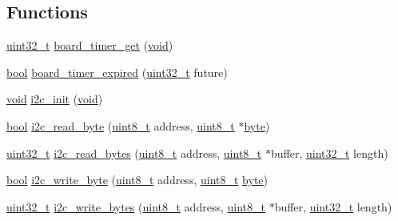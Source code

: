 \subsection*{Functions}
\begin{DoxyCompactItemize}
\item 
\hyperlink{_p_e___types_8h_a33594304e786b158f3fb30289278f5af}{uint32\+\_\+t} \hyperlink{_open_mote-_c_c2538_2i2c_8c_a1409dd4554f2fa814490c8d500eb4236}{board\+\_\+timer\+\_\+get} (\hyperlink{usb__devapi_8h_afabf60e7f57651d6d595a02c75f07cd0}{void})
\item 
\hyperlink{_p_e___types_8h_a97a80ca1602ebf2303258971a2c938e2}{bool} \hyperlink{_open_mote-_c_c2538_2i2c_8c_a7c18a2cb1673d859694a0b42bb7378b5}{board\+\_\+timer\+\_\+expired} (\hyperlink{_p_e___types_8h_a33594304e786b158f3fb30289278f5af}{uint32\+\_\+t} future)
\item 
\hyperlink{usb__devapi_8h_afabf60e7f57651d6d595a02c75f07cd0}{void} \hyperlink{group___i2_c_ga5730d9445429351b9f750084c5cb5aae}{i2c\+\_\+init} (\hyperlink{usb__devapi_8h_afabf60e7f57651d6d595a02c75f07cd0}{void})
\item 
\hyperlink{_p_e___types_8h_a97a80ca1602ebf2303258971a2c938e2}{bool} \hyperlink{group___i2_c_ga846c148c6c939378ab9db213af23b1ea}{i2c\+\_\+read\+\_\+byte} (\hyperlink{_p_e___types_8h_aba7bc1797add20fe3efdf37ced1182c5}{uint8\+\_\+t} address, \hyperlink{_p_e___types_8h_aba7bc1797add20fe3efdf37ced1182c5}{uint8\+\_\+t} $\ast$\hyperlink{_p_e___types_8h_a0c8186d9b9b7880309c27230bbb5e69d}{byte})
\item 
\hyperlink{_p_e___types_8h_a33594304e786b158f3fb30289278f5af}{uint32\+\_\+t} \hyperlink{group___i2_c_ga6c5d53542049a3b17a6c0f5c42b3f9f7}{i2c\+\_\+read\+\_\+bytes} (\hyperlink{_p_e___types_8h_aba7bc1797add20fe3efdf37ced1182c5}{uint8\+\_\+t} address, \hyperlink{_p_e___types_8h_aba7bc1797add20fe3efdf37ced1182c5}{uint8\+\_\+t} $\ast$buffer, \hyperlink{_p_e___types_8h_a33594304e786b158f3fb30289278f5af}{uint32\+\_\+t} length)
\item 
\hyperlink{_p_e___types_8h_a97a80ca1602ebf2303258971a2c938e2}{bool} \hyperlink{group___i2_c_ga6d9ff5e4b9a1909ada86224581be53b4}{i2c\+\_\+write\+\_\+byte} (\hyperlink{_p_e___types_8h_aba7bc1797add20fe3efdf37ced1182c5}{uint8\+\_\+t} address, \hyperlink{_p_e___types_8h_aba7bc1797add20fe3efdf37ced1182c5}{uint8\+\_\+t} \hyperlink{_p_e___types_8h_a0c8186d9b9b7880309c27230bbb5e69d}{byte})
\item 
\hyperlink{_p_e___types_8h_a33594304e786b158f3fb30289278f5af}{uint32\+\_\+t} \hyperlink{group___i2_c_ga2842bfa37d44e63d1777822400677387}{i2c\+\_\+write\+\_\+bytes} (\hyperlink{_p_e___types_8h_aba7bc1797add20fe3efdf37ced1182c5}{uint8\+\_\+t} address, \hyperlink{_p_e___types_8h_aba7bc1797add20fe3efdf37ced1182c5}{uint8\+\_\+t} $\ast$buffer, \hyperlink{_p_e___types_8h_a33594304e786b158f3fb30289278f5af}{uint32\+\_\+t} length)
\end{DoxyCompactItemize}


